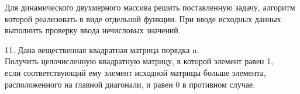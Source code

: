 Для динамического двухмерного массива решить поставленную задачу,
алгоритм которой реализовать в виде отдельной функции. При вводе исходных
данных выполнить проверку ввода нечисловых значений.

11. Дана вещественная квадратная матрица порядка n. \\
Получить целочисленную квадратную матрицу, в которой элемент равен 1, \\
если соответствующий ему элемент исходной матрицы больше элемента,\\ 
расположенного на главной диагонали, и равен 0 в противном случае.\\
